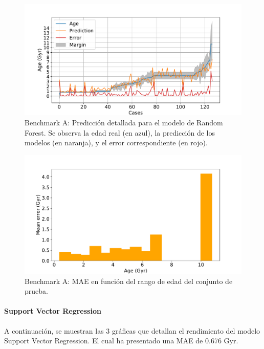 \begin{figure}[H]
\begin{center}
 \includegraphics[width=0.8\linewidth]{Figuras/Experimentos/B_A_rf_2.pdf}
\end{center}
\caption{Benchmark A: Predicción detallada para el modelo de Random Forest. Se observa la edad real (en azul), la predicción de los modelos (en naranja), y el error correspondiente (en rojo).}
 \label{fig:benchA_details_rf_2}
\end{figure}

\begin{figure}[H]
\begin{center}
 \includegraphics[width=0.8\linewidth]{Figuras/Experimentos/B_A_rf_3.pdf}
\end{center}
\caption{Benchmark A: MAE en función del rango de edad del conjunto de prueba.}
 \label{fig:benchA_details_rf_3}
\end{figure}

\paragraph{Support Vector Regression} 
A continuación, se muestran las 3 gráficas que detallan el rendimiento del modelo Support Vector Regression. El cual ha presentado una MAE de 0.676 Gyr.

